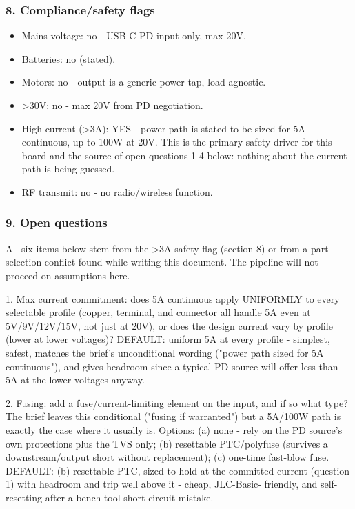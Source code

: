 \documentclass[11pt,a4paper]{article}
\begin{document}
\subsubsection*{8. Compliance/safety flags}
\begin{itemize}
\item Mains voltage: no - USB-C PD input only, max 20V.
\item Batteries: no (stated).
\item Motors: no - output is a generic power tap, load-agnostic.
\item \textgreater{}30V: no - max 20V from PD negotiation.
\item High current (\textgreater{}3A): YES - power path is stated to be sized for 5A
continuous, up to 100W at 20V. This is the primary safety driver for
this board and the source of open questions 1-4 below: nothing about the
current path is being guessed.
\item RF transmit: no - no radio/wireless function.
\end{itemize}
\subsubsection*{9. Open questions}
All six items below stem from the \textgreater{}3A safety flag (section 8) or from a part-selection conflict found while writing this document. The pipeline will not proceed on assumptions here.

1. Max current commitment: does 5A continuous apply UNIFORMLY to every selectable profile (copper, terminal, and connector all handle 5A even at 5V/9V/12V/15V, not just at 20V), or does the design current vary by profile (lower at lower voltages)? DEFAULT: uniform 5A at every profile - simplest, safest, matches the brief's unconditional wording ("power path sized for 5A continuous"), and gives headroom since a typical PD source will offer less than 5A at the lower voltages anyway.

2. Fusing: add a fuse/current-limiting element on the input, and if so what type? The brief leaves this conditional ("fusing if warranted") but a 5A/100W path is exactly the case where it usually is. Options: (a) none - rely on the PD source's own protections plus the TVS only; (b) resettable PTC/polyfuse (survives a downstream/output short without replacement); (c) one-time fast-blow fuse. DEFAULT: (b) resettable PTC, sized to hold at the committed current (question 1) with headroom and trip well above it - cheap, JLC-Basic- friendly, and self-resetting after a bench-tool short-circuit mistake.
\end{document}
